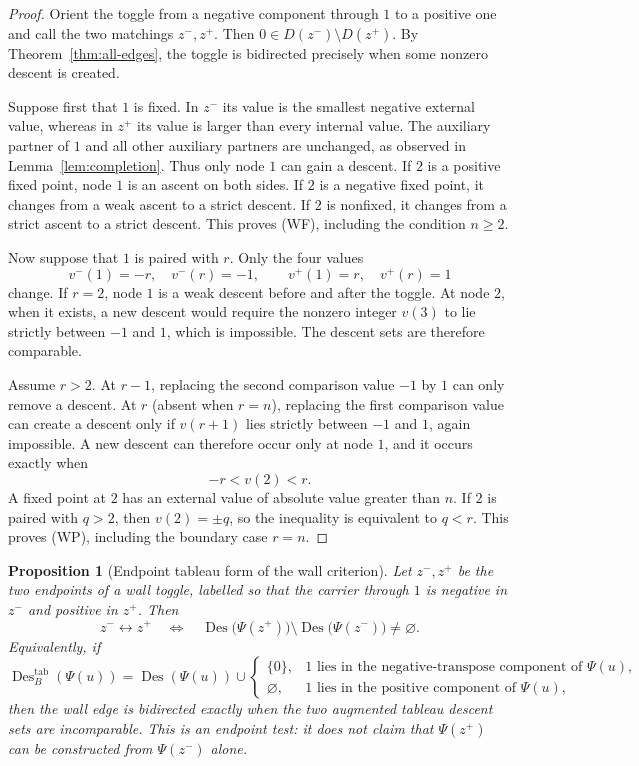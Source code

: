 \documentclass[11pt]{article}
\newtheorem{proposition}[theorem]{Proposition}
\theoremstyle{definition}
\theoremstyle{remark}
\newcommand{\Des}{\operatorname{Des}}
\begin{document}
\begin{proof}
Orient the toggle from a negative component through $1$ to a positive one
and call the two matchings $z^-,z^+$.  Then
$0\in D(z^-)\setminus D(z^+)$.  By Theorem~\ref{thm:all-edges}, the
toggle is bidirected precisely when some nonzero descent is created.

Suppose first that $1$ is fixed.  In $z^-$ its value is the smallest
negative external value, whereas in $z^+$ its value is larger than every
internal value.  The auxiliary partner of $1$ and all other auxiliary
partners are unchanged, as observed in Lemma~\ref{lem:completion}.  Thus
only node $1$ can gain a descent.  If $2$ is a positive fixed point, node
$1$ is an ascent on both sides.  If $2$ is a negative fixed point, it
changes from a weak ascent to a strict descent.  If $2$ is nonfixed, it
changes from a strict ascent to a strict descent.  This proves
\textup{(WF)}, including the condition $n\geq2$.

Now suppose that $1$ is paired with $r$.  Only the four values
\[
 v^-(1)=-r,\quad v^-(r)=-1,
 \qquad
 v^+(1)=r,\quad v^+(r)=1
\]
change.  If $r=2$, node $1$ is a weak descent before and after the toggle.
At node $2$, when it exists, a new descent would require the nonzero
integer $v(3)$ to lie strictly between $-1$ and $1$, which is impossible.
The descent sets are therefore comparable.

Assume $r>2$.  At $r-1$, replacing the second comparison value $-1$ by
$1$ can only remove a descent.  At $r$ (absent when $r=n$), replacing the
first comparison value can create a descent only if $v(r+1)$ lies strictly
between $-1$ and $1$, again impossible.  A new descent can therefore occur
only at node $1$, and it occurs exactly when
\[
                              -r<v(2)<r.
\]
A fixed point at $2$ has an external value of absolute value greater than
$n$.  If $2$ is paired with $q>2$, then $v(2)=\pm q$, so the inequality
is equivalent to $q<r$.  This proves \textup{(WP)}, including the
boundary case $r=n$.
\end{proof}

\begin{proposition}[Endpoint tableau form of the wall criterion]
\label{prop:tableau-wall-criterion}
Let $z^-,z^+$ be the two endpoints of a wall toggle, labelled so that the
carrier through $1$ is negative in $z^-$ and positive in $z^+$.  Then
\begin{equation}
 z^-\longleftrightarrow z^+
 \quad\Longleftrightarrow\quad
 \Des\bigl(\Psi(z^+)\bigr)
       \setminus\Des\bigl(\Psi(z^-)\bigr)\ne\varnothing.
 \label{eq:tableau-wall-criterion}
\end{equation}
Equivalently, if
\[
 \Des_B^{\mathrm{tab}}(\Psi(u))=
 \Des(\Psi(u))\cup
 \begin{cases}
  \{0\},&1\text{ lies in the negative-transpose component of }\Psi(u),\\
  \varnothing,&1\text{ lies in the positive component of }\Psi(u),
 \end{cases}
\]
then the wall edge is bidirected exactly when the two augmented tableau
descent sets are incomparable.  This is an endpoint test: it does not
claim that $\Psi(z^+)$ can be constructed from $\Psi(z^-)$ alone.
\end{proposition}
\end{document}
